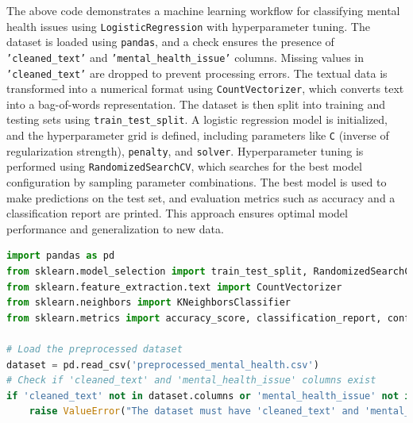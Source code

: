\noindent
The above code demonstrates a machine learning workflow for classifying mental health issues using \texttt{LogisticRegression} with hyperparameter tuning. The dataset is loaded using \texttt{pandas}, and a check ensures the presence of \texttt{'cleaned\_text'} and \texttt{'mental\_health\_issue'} columns. Missing values in \texttt{'cleaned\_text'} are dropped to prevent processing errors. The textual data is transformed into a numerical format using \texttt{CountVectorizer}, which converts text into a bag-of-words representation. The dataset is then split into training and testing sets using \texttt{train\_test\_split}. A logistic regression model is initialized, and the hyperparameter grid is defined, including parameters like \texttt{C} (inverse of regularization strength), \texttt{penalty}, and \texttt{solver}. Hyperparameter tuning is performed using \texttt{RandomizedSearchCV}, which searches for the best model configuration by sampling parameter combinations. The best model is used to make predictions on the test set, and evaluation metrics such as accuracy and a classification report are printed. This approach ensures optimal model performance and generalization to new data.

\begin{tcolorbox}[colback=gray!5!white, colframe=gray!80!black, boxrule=0.5pt, title=K Nearest Neighbours]
    \begin{lstlisting}[language=Python]
import pandas as pd
from sklearn.model_selection import train_test_split, RandomizedSearchCV
from sklearn.feature_extraction.text import CountVectorizer
from sklearn.neighbors import KNeighborsClassifier
from sklearn.metrics import accuracy_score, classification_report, confusion_matrix

# Load the preprocessed dataset
dataset = pd.read_csv('preprocessed_mental_health.csv')
# Check if 'cleaned_text' and 'mental_health_issue' columns exist
if 'cleaned_text' not in dataset.columns or 'mental_health_issue' not in dataset.columns:
    raise ValueError("The dataset must have 'cleaned_text' and 'mental_health_issue' columns.")
\end{lstlisting}
\end{tcolorbox}

